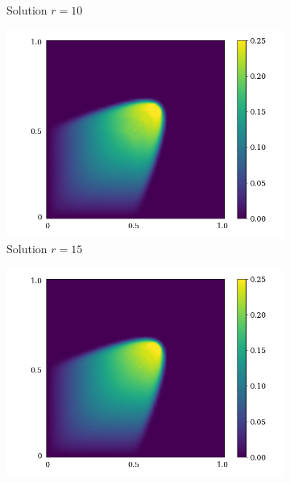 \begin{figure}[ht!]
\begin{center}
\begin{subfigure}[b]{0.20\textwidth}
\begin{center}
            \end{center}
            \caption{Solution $r = 10$}
        \end{subfigure}
   \begin{subfigure}[b]{0.20\textwidth}
            \begin{center}
                \includegraphics[trim = {0, 0, 3cm, 0}, clip, width=\textwidth]{Pictures/X-rom-LE-DAE-15.png}
            \end{center}
            \caption{Solution $r = 15$}
        \end{subfigure}
   \begin{subfigure}[b]{0.20\textwidth}
            \begin{center}
                \includegraphics[trim = {0, 0, 3cm, 0}, clip, width=\textwidth]{Pictures/X-rom-LE-DAE-20.png}

\end{center}
\end{subfigure}
\end{center}
\end{figure}
